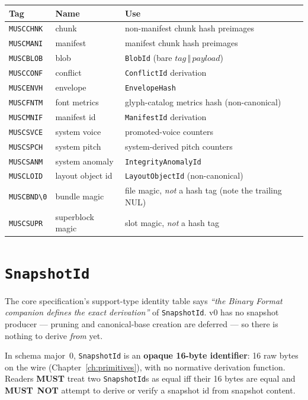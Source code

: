\documentclass[11pt,letterpaper]{report}
\newcounter{requirement}[chapter]
\newcommand{\MUST}{\textbf{MUST}}
\newcommand{\MUSTNOT}{\textbf{MUST}\nobreak\ \textbf{NOT}}
\newcommand{\cat}{\ensuremath{\,\Vert\,}}
\begin{document}
\begingroup\small
\begin{longtable}{p{1.05in} p{1.55in} p{3.0in}}
  \toprule
  \textbf{Tag} & \textbf{Name} & \textbf{Use} \\
  \midrule
  \endhead
  \texttt{MUSCCHNK} & chunk & non-manifest chunk hash preimages \\
  \texttt{MUSCMANI} & manifest & manifest chunk hash preimages \\
  \texttt{MUSCBLOB} & blob & \texttt{BlobId} (bare $\mathit{tag} \cat \mathit{payload}$) \\
  \texttt{MUSCCONF} & conflict & \texttt{ConflictId} derivation \\
  \texttt{MUSCENVH} & envelope & \texttt{EnvelopeHash} \\
  \texttt{MUSCFNTM} & font metrics & glyph-catalog metrics hash (non-canonical) \\
  \texttt{MUSCMNIF} & manifest id & \texttt{ManifestId} derivation \\
  \texttt{MUSCSVCE} & system voice & promoted-voice counters \\
  \texttt{MUSCSPCH} & system pitch & system-derived pitch counters \\
  \texttt{MUSCSANM} & system anomaly & \texttt{IntegrityAnomalyId} \\
  \texttt{MUSCLOID} & layout object id & \texttt{LayoutObjectId} (non-canonical) \\
  \midrule
  \texttt{MUSCBND\textbackslash0} & bundle magic & file magic, \emph{not} a hash tag (note the trailing NUL) \\
  \texttt{MUSCSUPR} & superblock magic & slot magic, \emph{not} a hash tag \\
  \bottomrule
\end{longtable}
\endgroup

\section{\texttt{SnapshotId}}
\label{sec:ids:snapshot-id}

The core specification's support-type identity table says \emph{``the Binary
Format companion defines the exact derivation''} of \texttt{SnapshotId}. v0
has no snapshot producer --- pruning and canonical-base creation are deferred
--- so there is nothing to derive \emph{from} yet.

\begin{requirement}
\label{req:binfmt:snapshot-id-opaque}
In schema major~0, \texttt{SnapshotId} is an \textbf{opaque 16-byte
identifier}: 16 raw bytes on the wire (Chapter~\ref{ch:primitives}), with no
normative derivation function. Readers \MUST{} treat two
\texttt{SnapshotId}s as equal iff their 16 bytes are equal and \MUSTNOT{}
attempt to derive or verify a snapshot id from snapshot content.
\end{requirement}
\end{document}
